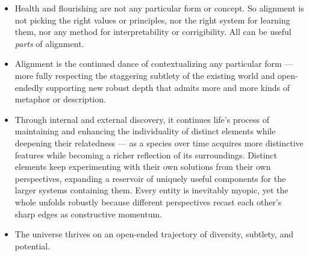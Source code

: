 \documentclass[11pt]{article}
\begin{document}
\begin{itemize}
  \item Health and flourishing are not any particular form or concept. So alignment is not picking the right values or principles, nor the right system for learning them, nor any method for interpretability or corrigibility. All can be useful \textit{parts} of alignment.
  \item Alignment is the continued dance of contextualizing any particular form --- more fully respecting the staggering subtlety of the existing world and open-endedly supporting new robust depth that admits more and more kinds of metaphor or description.
  \item Through internal and external discovery, it continues life's process of maintaining and enhancing the individuality of distinct elements while deepening their relatedness --- as a species over time acquires more distinctive features while becoming a richer reflection of its surroundings. Distinct elements keep experimenting with their own solutions from their own perspectives, expanding a reservoir of uniquely useful components for the larger systems containing them. Every entity is inevitably myopic, yet the whole unfolds robustly because different perspectives recast each other's sharp edges as constructive momentum.
  \item The universe thrives on an open-ended trajectory of diversity, subtlety, and potential.
\end{itemize}
\end{document}
